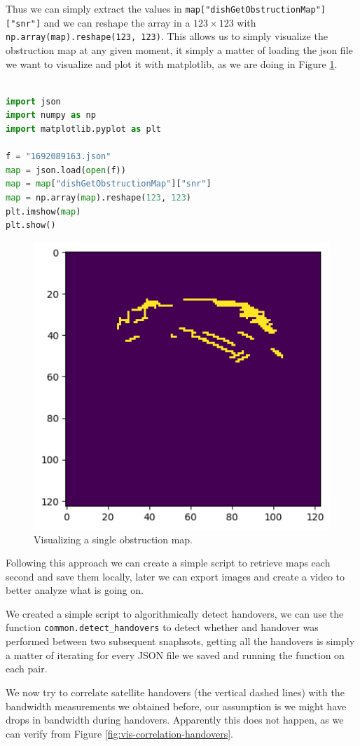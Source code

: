\documentclass[IN,11pt,twoside,openright,bachelor,english]{tumthesis}
\begin{document}
Thus we can simply extract the values in \texttt{map["dishGetObstructionMap"]["snr"]} and we can reshape the array in a $123\times123$ with \texttt{np.array(map).reshape(123, 123)}. This allows us to simply visualize the obstruction map at any given moment, it simply a matter of loading the json file we want to visualize and plot it with matplotlib, as we are doing in Figure \ref{fig:vis-single-map}.

\begin{lstlisting}[language=python,caption={visualizing a single obstruction map},captionpos=b]

import json
import numpy as np
import matplotlib.pyplot as plt

f = "1692089163.json"
map = json.load(open(f))
map = map["dishGetObstructionMap"]["snr"]
map = np.array(map).reshape(123, 123)
plt.imshow(map)
plt.show()
\end{lstlisting}


\begin{figure}
	\centering
	\includegraphics[width=0.5\columnwidth]{img/single_map.png}
	\caption{Visualizing a single obstruction map.}
	\label{fig:vis-single-map}
\end{figure}


Following this approach we can create a simple script to retrieve maps each second and save them locally, later we can export images and create a video to better analyze what is going on. 

We created a simple script to algorithmically detect handovers, we can use the function \texttt{common.detect\_handovers} to detect whether and handover was performed between two subsequent snaphsots, getting all the handovers is simply a matter of iterating for every JSON file we saved and running the function on each pair.

We now try to correlate satellite handovers (the vertical dashed lines) with the bandwidth measurements we obtained before, our assumption is we might have drops in bandwidth during handovers. Apparently this does not happen, as we can verify from Figure \ref{fig:vis-correlation-handovers}.
\end{document}
